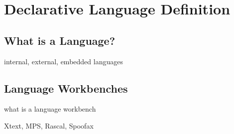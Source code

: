 \newpage
\chapter{Declarative Language Definition}


\section{What is a Language?}

internal, external, embedded languages

\newpage
\section{Language Workbenches}

what is a language workbench

Xtext, MPS, Rascal, Spoofax

